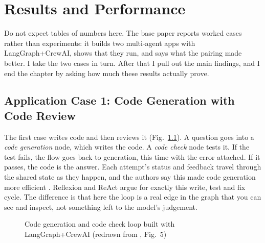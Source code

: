 \documentclass[12pt,a4paper]{report}
\begin{document}
\chapter{Results and Performance}

Do not expect tables of numbers here. The base paper reports worked cases rather than experiments: it builds two multi-agent apps with LangGraph+CrewAI, shows that they run, and says what the pairing made better. I take the two cases in turn. After that I pull out the main findings, and I end the chapter by asking how much these results actually prove.

\section{Application Case 1: Code Generation with Code Review}

The first case writes code and then reviews it (Fig.~\ref{fig:codegen}). A question goes into a \emph{code generation} node, which writes the code. A \emph{code check} node tests it. If the test fails, the flow goes back to generation, this time with the error attached. If it passes, the code is the answer. Each attempt's status and feedback travel through the shared state as they happen, and the authors say this made code generation more efficient \cite{duan2024langgraphcrewai}. Reflexion and ReAct argue for exactly this write, test and fix cycle. The difference is that here the loop is a real edge in the graph that you can see and inspect, not something left to the model's judgement.

\begin{figure}[H]
\centering
{}
\caption{Code generation and code check loop built with LangGraph+CrewAI (redrawn from \cite{duan2024langgraphcrewai}, Fig.~5)}
\label{fig:codegen}
\end{figure}
\end{document}
